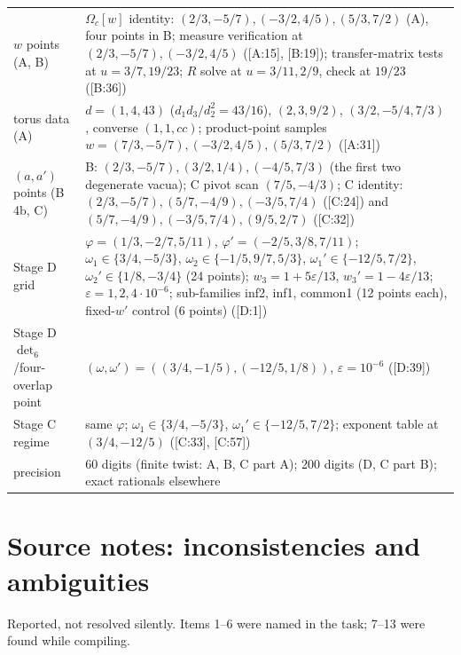 \documentclass[10pt]{article}
\newcommand{\cl}[2]{\textsf{[#1:#2]}}
\newcommand{\Om}{\Omega}
\begin{document}
\begin{center}
\begin{longtable}{@{}p{3.2cm}p{13.2cm}@{}}
$w$ points (A, B) & $\Om_c[w]$ identity: $(2/3,-5/7),(-3/2,4/5),(5/3,7/2)$ (A), four points in B; measure verification at $(2/3,-5/7),(-3/2,4/5)$ (\cl{A}{15}, \cl{B}{19}); transfer-matrix tests at $u=3/7,19/23$; $R$ solve at $u=3/11,2/9$, check at $19/23$ (\cl{B}{36}) \\
torus data (A) & $d=(1,4,43)$ ($d_1d_3/d_2^2=43/16$), $(2,3,9/2)$, $(3/2,-5/4,7/3)$, converse $(1,1,cc)$; product-point samples $w=(7/3,-5/7),(-3/2,4/5),(5/3,7/2)$ (\cl{A}{31}) \\
$(a,a')$ points (B 4b, C) & B: $(2/3,-5/7),(3/2,1/4),(-4/5,7/3)$ (the first two degenerate vacua); C pivot scan $(7/5,-4/3)$; C identity: $(2/3,-5/7),(5/7,-4/9),(-3/5,7/4)$ (\cl{C}{24}) and $(5/7,-4/9),(-3/5,7/4),(9/5,2/7)$ (\cl{C}{32}) \\
Stage D grid & $\varphi=(1/3,-2/7,5/11)$, $\varphi'=(-2/5,3/8,7/11)$; $\omega_1\in\{3/4,-5/3\}$, $\omega_2\in\{-1/5,9/7,5/3\}$, $\omega_1'\in\{-12/5,7/2\}$, $\omega_2'\in\{1/8,-3/4\}$ (24 points); $w_3=1+5\varepsilon/13$, $w_3'=1-4\varepsilon/13$; $\varepsilon=1,2,4\cdot10^{-6}$; sub-families inf2, inf1, common1 (12 points each), fixed-$w'$ control (6 points) (\cl{D}{1}) \\
Stage D $\det_6$/four-overlap point & $(\omega,\omega')=((3/4,-1/5),(-12/5,1/8))$, $\varepsilon=10^{-6}$ (\cl{D}{39}) \\
Stage C regime & same $\varphi$; $\omega_1\in\{3/4,-5/3\}$, $\omega_1'\in\{-12/5,7/2\}$; exponent table at $(3/4,-12/5)$ (\cl{C}{33}, \cl{C}{57}) \\
precision & 60 digits (finite twist: A, B, C part A); 200 digits (D, C part B); exact rationals elsewhere \\\bottomrule
\end{longtable}\end{center}

\section{Source notes: inconsistencies and ambiguities}\label{app:notes}

Reported, not resolved silently. Items 1--6 were named in the task; 7--13 were found while compiling.
\end{document}
